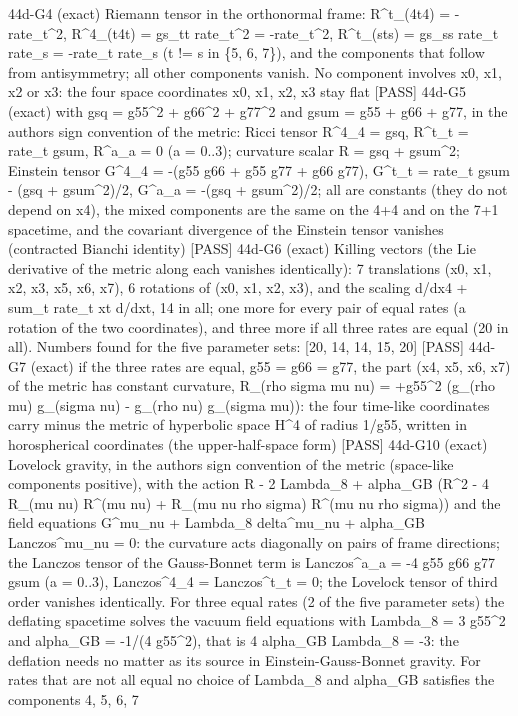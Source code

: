 \documentclass[
  10pt,
]{article}
\newenvironment{Shaded}{}{}
\newcommand{\NormalTok}[1]{#1}
\begin{document}
\begin{Shaded}
\begin{Highlighting}[]
\NormalTok{[PASS] 44d{-}G4  (exact) Riemann tensor in the orthonormal frame: R\^{}t\_(4t4) = {-}rate\_t\^{}2, R\^{}4\_(t4t) = gs\_tt rate\_t\^{}2 = {-}rate\_t\^{}2, R\^{}t\_(sts) = gs\_ss rate\_t rate\_s = {-}rate\_t rate\_s (t != s in \{5, 6, 7\}), and the components that follow from antisymmetry; all other components vanish. No component involves x0, x1, x2 or x3: the four space coordinates x0, x1, x2, x3 stay flat}
\NormalTok{[PASS] 44d{-}G5  (exact) with gsq = g55\^{}2 + g66\^{}2 + g77\^{}2 and gsum = g55 + g66 + g77, in the author\textquotesingle{}s sign convention of the metric: Ricci tensor R\^{}4\_4 = gsq, R\^{}t\_t = rate\_t gsum, R\^{}a\_a = 0 (a = 0..3); curvature scalar R = gsq + gsum\^{}2; Einstein tensor G\^{}4\_4 = {-}(g55 g66 + g55 g77 + g66 g77), G\^{}t\_t = rate\_t gsum {-} (gsq + gsum\^{}2)/2, G\^{}a\_a = {-}(gsq + gsum\^{}2)/2; all are constants (they do not depend on x4), the mixed components are the same on the 4+4 and on the 7+1 spacetime, and the covariant divergence of the Einstein tensor vanishes (contracted Bianchi identity)}
\NormalTok{[PASS] 44d{-}G6  (exact) Killing vectors (the Lie derivative of the metric along each vanishes identically): 7 translations (x0, x1, x2, x3, x5, x6, x7), 6 rotations of (x0, x1, x2, x3), and the scaling d/dx4 + sum\_t rate\_t xt d/dxt, 14 in all; one more for every pair of equal rates (a rotation of the two coordinates), and three more if all three rates are equal (20 in all). Numbers found for the five parameter sets: [20, 14, 14, 15, 20]}
\NormalTok{[PASS] 44d{-}G7  (exact) if the three rates are equal, g55 = g66 = g77, the part (x4, x5, x6, x7) of the metric has constant curvature, R\_(rho sigma mu nu) = +g55\^{}2 (g\_(rho mu) g\_(sigma nu) {-} g\_(rho nu) g\_(sigma mu)): the four time{-}like coordinates carry minus the metric of hyperbolic space H\^{}4 of radius 1/g55, written in horospherical coordinates (the upper{-}half{-}space form)}
\NormalTok{[PASS] 44d{-}G10  (exact) Lovelock gravity, in the author\textquotesingle{}s sign convention of the metric (space{-}like components positive), with the action R {-} 2 Lambda\_8 + alpha\_GB (R\^{}2 {-} 4 R\_(mu nu) R\^{}(mu nu) + R\_(mu nu rho sigma) R\^{}(mu nu rho sigma)) and the field equations G\^{}mu\_nu + Lambda\_8 delta\^{}mu\_nu + alpha\_GB Lanczos\^{}mu\_nu = 0: the curvature acts diagonally on pairs of frame directions; the Lanczos tensor of the Gauss{-}Bonnet term is Lanczos\^{}a\_a = {-}4 g55 g66 g77 gsum (a = 0..3), Lanczos\^{}4\_4 = Lanczos\^{}t\_t = 0; the Lovelock tensor of third order vanishes identically. For three equal rates (2 of the five parameter sets) the deflating spacetime solves the vacuum field equations with Lambda\_8 = 3 g55\^{}2 and alpha\_GB = {-}1/(4 g55\^{}2), that is 4 alpha\_GB Lambda\_8 = {-}3: the deflation needs no matter as its source in Einstein{-}Gauss{-}Bonnet gravity. For rates that are not all equal no choice of Lambda\_8 and alpha\_GB satisfies the components 4, 5, 6, 7}

\end{Highlighting}
\end{Shaded}
\end{document}
